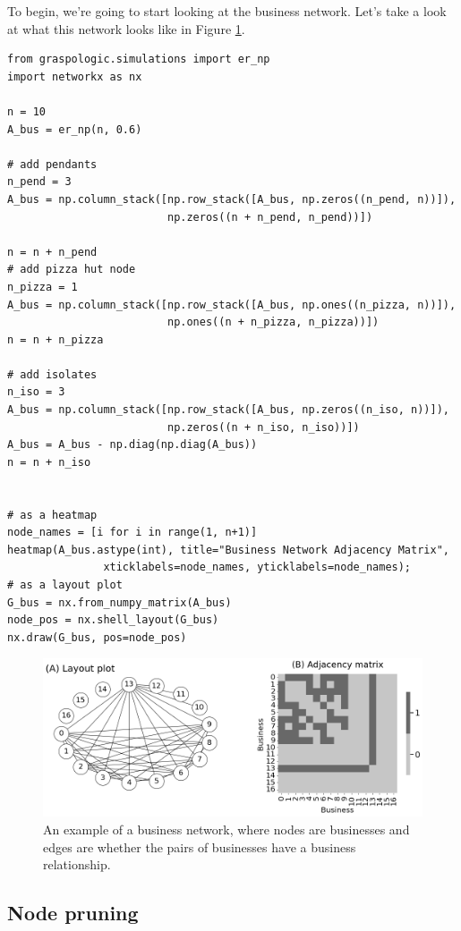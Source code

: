 To begin, we're going to start looking at the business network. Let's take a look at what this network looks like in Figure \ref{fig:ch4:businessex}.

\begin{lstlisting}[style=python]
from graspologic.simulations import er_np
import networkx as nx

n = 10
A_bus = er_np(n, 0.6)

# add pendants
n_pend = 3
A_bus = np.column_stack([np.row_stack([A_bus, np.zeros((n_pend, n))]), 
                         np.zeros((n + n_pend, n_pend))])

n = n + n_pend
# add pizza hut node
n_pizza = 1
A_bus = np.column_stack([np.row_stack([A_bus, np.ones((n_pizza, n))]), 
                         np.ones((n + n_pizza, n_pizza))])
n = n + n_pizza

# add isolates
n_iso = 3
A_bus = np.column_stack([np.row_stack([A_bus, np.zeros((n_iso, n))]), 
                         np.zeros((n + n_iso, n_iso))])
A_bus = A_bus - np.diag(np.diag(A_bus))
n = n + n_iso


# as a heatmap
node_names = [i for i in range(1, n+1)]
heatmap(A_bus.astype(int), title="Business Network Adjacency Matrix", 
               xticklabels=node_names, yticklabels=node_names);
# as a layout plot
G_bus = nx.from_numpy_matrix(A_bus)
node_pos = nx.shell_layout(G_bus)
nx.draw(G_bus, pos=node_pos)
\end{lstlisting}

\begin{figure}[h]
    \centering
    \includegraphics[width=\linewidth]{representations/ch4/Images/businessex.png}
    \caption[Business network example]{An example of a business network, where nodes are businesses and edges are whether the pairs of businesses have a business relationship.}
    \label{fig:ch4:businessex}
\end{figure}

\subsection{Node pruning}

